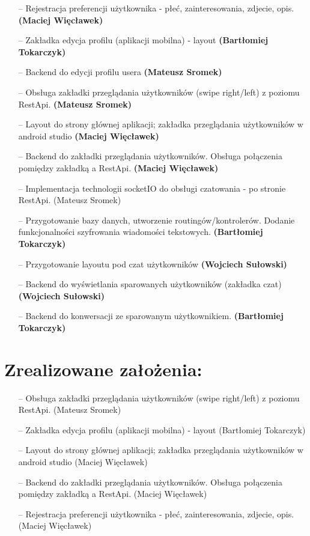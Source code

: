 \documentclass[12pt,a4paper]{article}
\begin{document}
\begin{itemize}
    \item [--] Rejestracja preferencji użytkownika - płeć, zainteresowania, zdjecie, opis. \textbf{(Maciej Więcławek)}

    \item [--] Zakładka edycja profilu (aplikacji mobilna) - layout  \textbf{(Bartłomiej Tokarczyk)}

    \item [--] Backend do edycji profilu usera \textbf{(Mateusz Sromek)}

    \item [--] Obsługa zakładki przeglądania użytkowników (swipe right/left) z poziomu RestApi.  \textbf{(Mateusz Sromek)}
    \item [--] Layout do strony głównej aplikacji; zakładka przeglądania użytkowników w android studio \textbf{(Maciej Więcławek)}
    \item [--] Backend do zakładki przeglądania użytkowników. Obsługa połączenia pomiędzy zakładką a RestApi. \textbf{(Maciej Więcławek)}
    \item [--] Implementacja technologii socketIO do obsługi czatowania - po stronie RestApi. {(Mateusz Sromek)}
    \item [--] Przygotowanie bazy danych, utworzenie routingów/kontrolerów. Dodanie funkcjonalności szyfrowania wiadomości tekstowych. \textbf{(Bartłomiej Tokarczyk)}
    \item [--] Przygotowanie layoutu pod czat użytkowników \textbf{(Wojciech Sułowski) }
    \item [--] Backend do wyświetlania sparowanych użytkowników (zakładka czat) \textbf{(Wojciech Sułowski)}
    \item [--] Backend do konwersacji ze sparowanym użytkownikiem. \textbf{(Bartłomiej Tokarczyk)}
\end{itemize}

\section{Zrealizowane założenia:}
\begin{itemize}
    \item [--] Obsługa zakładki przeglądania użytkowników (swipe right/left) z poziomu RestApi. (Mateusz Sromek)
    \item [--] Zakładka edycja profilu (aplikacji mobilna) - layout (Bartłomiej Tokarczyk) 
    \item [--] Layout do strony głównej aplikacji; zakładka przeglądania użytkowników w android studio (Maciej Więcławek)
    \item [--] Backend do zakładki przeglądania użytkowników. Obsługa połączenia pomiędzy zakładką a RestApi. (Maciej Więcławek)
    \item [--] Rejestracja preferencji użytkownika - płeć, zainteresowania, zdjecie, opis. (Maciej Więcławek)

\end{itemize}
\end{document}
